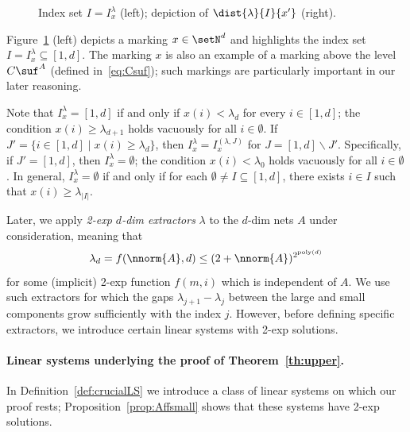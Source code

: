 \begin{figure}[t]
	\caption{Index set $I=I^\lambda_x$ (left);
	depiction of $\dist{\lambda}{I}{x'}$ (right).}\label{fig:extractor}
\end{figure}

Figure~\ref{fig:extractor} (left) depicts a marking $x\in\setN^d$
and highlights the index set $I=I^\lambda_x\subseteq[1,d]$. 
The marking $x$ is also an example of a marking 
above the level $C\suf^A$ (defined in~\eqref{eq:Csuf});
such markings are particularly important in our later reasoning.

Note that $I^\lambda_x=[1,d]$ if and only if $x(i)< \lambda_d$ for
every $i\in[1,d]$;
the condition  $x(i)\geq \lambda_{d+1}$ holds vacuously
for all $i\in\emptyset$.
If $J'=\{i\in[1,d]\mid x(i)\geq \lambda_d\}$, then 
$I^\lambda_x=I^{(\lambda,J)}_x$ for $J=[1,d]\smallsetminus J'$.
Specifically, if $J'=[1,d]$, then $I^\lambda_x=\emptyset$; the
condition
$x(i)<\lambda_{0}$ holds vacuously for all $i\in\emptyset$.
In general,  $I^\lambda_x=\emptyset$ if and only if for each
$\emptyset\neq I\subseteq[1,d]$, there exists $i\in I$ such that
$x(i)\geq \lambda_{|I|}$.

Later, we apply \emph{2-exp $d$-dim extractors} $\lambda$ to the $d$-dim nets $A$ under
consideration, meaning 
that 
\begin{equation*}
\lambda_d=f(\nnorm{A},d)\leq(2+\nnorm{A})^{2^{\text{poly}(d)}}
\end{equation*}
for some (implicit) 2-exp function $f(m,i)$ which is independent of $A$.
We use such extractors for which
the gaps $\lambda_{j+1}-\lambda_j$ between the large and small
components grow sufficiently with the index $j$.
However, before defining specific extractors, we introduce certain linear systems with
2-exp solutions.



\paragraph{Linear systems underlying the proof of Theorem~\ref{th:upper}.}
In Definition~\ref{def:crucialLS} we introduce a class of linear systems
on which our proof rests; Proposition~\ref{prop:Affsmall} shows that
these systems have 2-exp solutions.

